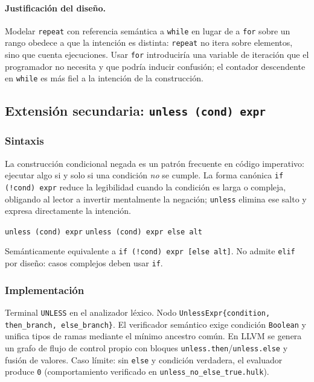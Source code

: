 \documentclass[11pt,a4paper]{article}
\begin{document}
\paragraph{Justificación del diseño.} Modelar \texttt{repeat} con referencia semántica a \texttt{while} en lugar de a \texttt{for} sobre un rango obedece a que la intención es distinta: \texttt{repeat} no itera sobre elementos, sino que cuenta ejecuciones. Usar \texttt{for} introduciría una variable de iteración que el programador no necesita y que podría inducir confusión; el contador descendente en \texttt{while} es más fiel a la intención de la construcción.

\subsection{Extensión secundaria: \texttt{unless (cond) expr}}

\subsubsection{Sintaxis}

La construcción condicional negada es un patrón frecuente en código imperativo: ejecutar algo si y solo si una condición \emph{no} se cumple. La forma canónica \texttt{if (!cond) expr} reduce la legibilidad cuando la condición es larga o compleja, obligando al lector a invertir mentalmente la negación; \texttt{unless} elimina ese salto y expresa directamente la intención.

\begin{center}
\texttt{unless (cond) expr} \qquad \texttt{unless (cond) expr else alt}
\end{center}

Semánticamente equivalente a \texttt{if (!cond) expr [else alt]}. No admite \texttt{elif} por diseño: casos complejos deben usar \texttt{if}.

\subsubsection{Implementación}

Terminal \texttt{UNLESS} en el analizador léxico. Nodo \texttt{UnlessExpr\{condition, then\_branch, else\_branch\}}. El verificador semántico exige condición \texttt{Boolean} y unifica tipos de ramas mediante el mínimo ancestro común. En LLVM se genera un grafo de flujo de control propio con bloques \texttt{unless.then}/\texttt{unless.else} y fusión de valores. Caso límite: sin \texttt{else} y condición verdadera, el evaluador produce \texttt{0} (comportamiento verificado en \texttt{unless\_no\_else\_true.hulk}).
\end{document}
